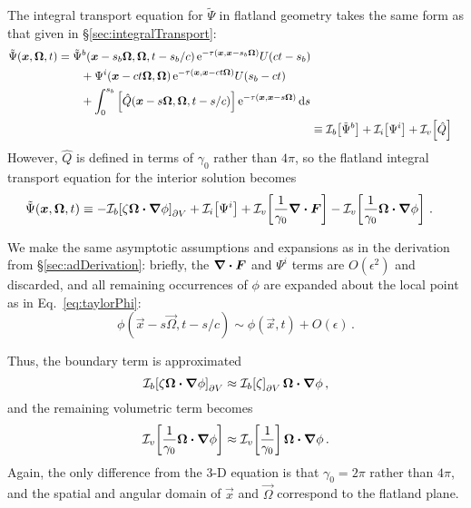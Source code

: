 The integral transport equation for $\tilde\Psi$ in flatland geometry takes the
same form as that given in \S\ref{sec:integralTransport}:
\begin{align*}
\begin{split}
  \tilde\Psi(\bm{x}, \bm{\Omega}, t)
  &=
  \tilde\Psi^b(\bm{x} - s_b\bm{\Omega}, \bm{\Omega}, t - s_b/c)
  \mathop{}\!\mathrm{e}^{ -\tau(\bm{x}, \bm{x} - s_b \bm{\Omega})}
  U(ct - s_b)
  \\
  &\qquad + \Psi^i( \bm{x} - ct \bm{\Omega}, \bm{\Omega})
  \mathop{}\!\mathrm{e}^{ -\tau(\bm{x}, \bm{x} - ct \bm{\Omega})}
  U( s_b - ct)
  \\
  &\qquad + \int_{0}^{s_b}
  \left[ \hat Q(\bm{x} - s \bm{\Omega}, \bm{\Omega}, t-s/c)
  \right]
  \mathop{}\!\mathrm{e}^{ -\tau(\bm{x}, \bm{x} - s \bm{\Omega})}
  \mathop{}\!\mathrm{d} s
\end{split}
  \\
    &\equiv \mathcal{I}_{b}\!\left[\tilde\Psi^b\right]
    + \mathcal{I}_{i}\!\left[\Psi^i\right]
    + \mathcal{I}_{v}\!\left[\hat Q\right]
\end{align*}
However, $\hat Q$ is defined in terms of $\gamma_0$ rather than $4\pi$, so the
flatland integral transport equation for the interior solution becomes
\begin{align} \label{eq:flatinverseTransportBrief}
    \tilde\Psi(\bm{x}, \bm{\Omega}, t)
    &\equiv
    -\mathcal{I}_{b}\!\left[\zeta \bm{\Omega}\bm{\cdot} \bm{\nabla} \phi\right]_{\partial V}
    + \mathcal{I}_{i}\!\left[\Psi^i\right]
    + \mathcal{I}_{v}\!\left[\frac{1}{\gamma_0} \bm{\nabla} \bm{\cdot}\bm{F} \right]
    - \mathcal{I}_{v}\!\left[\frac{1}{\gamma_0} \bm{\Omega}\bm{\cdot} \bm{\nabla} \phi\right]
    \,.
\end{align}

We make the same asymptotic assumptions and expansions as in the derivation from
\S\ref{sec:adDerivation}: briefly, the $\bm{\nabla} \bm{\cdot}\bm{F}$ and $\Psi^i$ terms are
$O(\epsilon^2)$ and discarded, and all remaining occurrences of $\phi$ are
expanded about the local point as in Eq.~\eqref{eq:taylorPhi}:
\begin{equation*}
  \phi(\vec{x} - s \vec{\Omega}, t-s/c)
  \sim \phi(\vec{x},t) + O(\epsilon) \,.
\end{equation*}

Thus, the boundary term is approximated 
\begin{equation*}
  \mathcal{I}_{b}\!\left[\zeta \bm{\Omega}\bm{\cdot} \bm{\nabla} \phi\right]_{\partial V}
  \approx \mathcal{I}_{b}\!\left[\zeta\right]_{\partial V}  \bm{\Omega}\bm{\cdot} \bm{\nabla} \phi \,,
\end{equation*}
and the remaining volumetric term becomes
\begin{equation*}
  \mathcal{I}_{v}\!\left[\frac{1}{\gamma_0} \bm{\Omega}\bm{\cdot} \bm{\nabla} \phi\right]
  \approx \mathcal{I}_{v}\!\left[\frac{1}{\gamma_0}\right] \bm{\Omega}\bm{\cdot} \bm{\nabla} \phi \,.
\end{equation*}
Again, the only difference from the 3-D equation is that $\gamma_0=2\pi$ rather
than $4\pi$, and the spatial and angular domain of $\vec{x}$ and $\vec{\Omega}$
correspond to the flatland plane.

